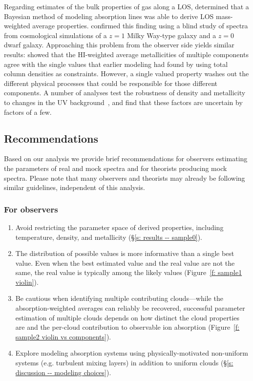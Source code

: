 \documentclass[fleqn,usenatbib]{mnras}
\begin{document}
Regarding estimates of the bulk properties of gas along a LOS,
\cite{liang2018Observing} determined that a Bayesian method of modeling absorption lines was able to derive LOS  mass-weighted average properties.
\cite{marra2021.cosmo.sims.test.observational.modeling} confirmed this finding using a blind study of spectra from cosmological simulations of a $z=1$ Milky Way-type galaxy and a $z=0$ dwarf galaxy.
Approaching this problem from the observer side yields similar results:
\cite{sameer2021Cloudbycloud} showed that the HI-weighted average metallicities of multiple components agree with the single values that earlier modeling had found by using total column densities as constraints.
However, a single valued property washes out the different physical processes that could be responsible for those different components.
A number of analyses test the robustness of density and metallicity to changes in the UV background~\citep[][]{Wotta2016, Wotta2019, acharya2021How,Gibson2022}, and find that these factors are uncertain by factors of a few.

\subsection{Recommendations}

Based on our analysis we provide brief recommendations for observers estimating the parameters of real and mock spectra and for theorists producing mock spectra.
Please note that many observers and theorists may already be following similar guidelines, 
independent of this analysis.

\subsubsection{For observers}

\begin{enumerate}
    \item Avoid restricting the parameter space of derived properties, including temperature, density, and metallicity (\S\ref{s: results -- sample0}). 
    \item The distribution of possible values is more informative than a single best value. Even when the best estimated value and the real value are not the same, the real value is typically among the likely values (Figure~\ref{f: sample1 violin}).
    \item Be cautious when identifying multiple contributing clouds---while the absorption-weighted averages can reliably be recovered, successful parameter estimation of multiple clouds depends on how distinct the cloud properties are and the per-cloud contribution to observable ion absorption (Figure~\ref{f: sample2 violin vs components}).
    \item Explore modeling absorption systems using physically-motivated non-uniform systems (e.g. turbulent mixing layers) in addition to uniform clouds (\S\ref{s: discussion -- modeling choices}).
\end{enumerate}
\end{document}
